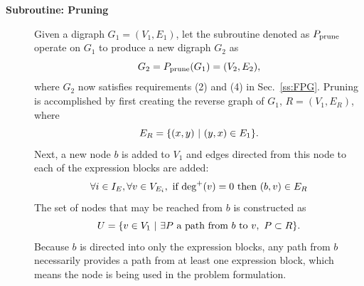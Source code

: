     \begin{description}
    \item[\bf{Subroutine: Pruning}] 
        Given a digraph $G_1 = (V_1,E_1)$, let the subroutine denoted as $P_\textrm{prune}$ operate on $G_1$ to produce a new digraph $G_2$ as
	\begin{equation}
	G_2 = P_\textrm{prune}(G_1) = (V_2,E_2),
	\end{equation} 
	where $G_2$ now satisfies requirements (2) and (4) in Sec.~\ref{ss:FPG}.
        Pruning is accomplished by first creating the reverse graph of $G_1$, $R = (V_1,E_R)$, where
	\begin{equation}
	E_R = \{ (x,y) \ | \  (y,x) \in E_1\}.
	\end{equation}
	Next, a new node $b$ is added to $V_1$ and edges directed from this node to each of the expression blocks are added:
    \begin{equation}
        \forall i \in I_E,\forall v \in V_{E_i}, \textrm{ if } \textrm{deg}^+(v)=0 \textrm{ then } (b,v) \in E_R
    \end{equation}
        The set of nodes that may be reached from $b$ is constructed as
    \begin{equation}
        U = \{ v \in V_1 \ | \  \exists P \textrm{ a path from $b$ to $v$}, \ P \subset R \}.
        \end{equation}
	Because $b$ is directed into only the expression blocks, any path from $b$ necessarily provides a path from at least one expression block, which means the node is being used in the problem formulation.


\end{description}
